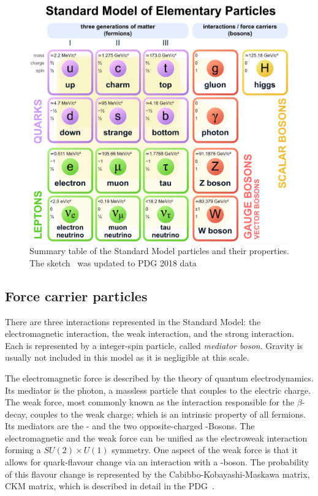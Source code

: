 \begin{figure}
	\centering
	\includegraphics[width=\textwidth]{figures_SM/standard_model.eps}
	\caption[Standard Model particles]{Summary table of the Standard Model particles and their properties. The sketch~\cite{standard_model} was updated to PDG 2018 data~\cite{PDG}}
	\label{fig:sm}
\end{figure}



\subsection{Force carrier particles}

There are three interactions represented in the Standard Model: the electromagnetic interaction, the weak interaction, and the strong interaction. Each is represented by a integer-spin particle, called \emph{mediator boson}. Gravity is usually not included in this model as it is negligible at this scale. 

The electromagnetic force is described by the theory of quantum electrodynamics. Its mediator is the photon, a massless particle that couples to the electric charge.
The weak force, most commonly known as the interaction responsible for the $\beta$-decay, couples to the weak charge; which is an intrinsic property of all fermions. Its mediators are the \PZ- and the two opposite-charged \PW-Bosons.
The electromagnetic and the weak force can be unified as the electroweak interaction forming a $SU(2) \times U(1)$ symmetry.
One aspect of the weak force is that it allows for quark-flavour change via an interaction with a \PW-boson. The probability of this flavour change is represented by the Cabibbo-Kobayashi-Maskawa matrix, CKM matrix, which is described in detail in the PDG~\cite{PDG}.

